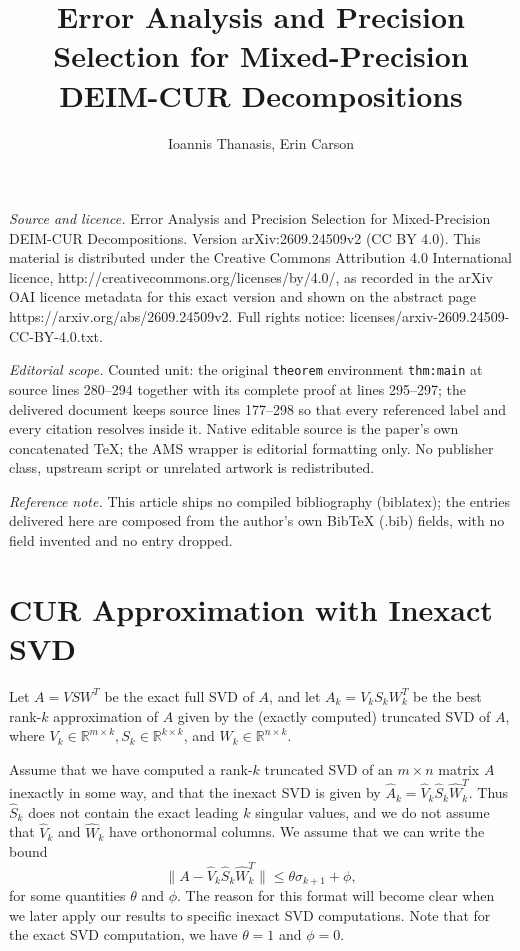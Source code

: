 \documentclass[10pt,a4paper]{amsart}
\newcommand{\What}{\widehat{W}}
\newcommand{\Shat}{\widehat{S}}
\newcommand{\Vhat}{\widehat{V}}
\newcommand{\E}{\theta}
\newcommand{\F}{\phi}
\def\norm#1{\|#1\|}
\begin{document}
\title[Error Analysis and Precision Selection for Mixed-Precision D]{Error Analysis and Precision Selection for Mixed-Precision DEIM-CUR Decompositions}
\author{Ioannis Thanasis, Erin Carson}
\date{}
\maketitle
\noindent\emph{Source and licence.} Error Analysis and Precision Selection for Mixed-Precision DEIM-CUR Decompositions. Version arXiv:2609.24509v2 (CC BY 4.0). This material is distributed under the Creative Commons Attribution 4.0 International licence, http://creativecommons.org/licenses/by/4.0/, as recorded in the arXiv OAI licence metadata for this exact version and shown on the abstract page https://arxiv.org/abs/2609.24509v2. Full rights notice: licenses/arxiv-2609.24509-CC-BY-4.0.txt.\par\smallskip
\noindent\textit{Editorial scope.} Counted unit: the original \texttt{theorem} environment \texttt{thm:main} at source lines 280--294 together with its complete proof at lines 295--297; the delivered document keeps source lines 177--298 so that every referenced label and every citation resolves inside it. Native editable source is the paper's own concatenated TeX; the AMS wrapper is editorial formatting only. No publisher class, upstream script or unrelated artwork is redistributed.
\par\smallskip\noindent\textit{Reference note.} This article ships no compiled bibliography (biblatex); the entries delivered here are composed from the author's own BibTeX (.bib) fields, with no field invented and no entry dropped.
\section{CUR Approximation with Inexact SVD}
\label{sec:inexactSVD}

\hspace{5mm}Let $A = V S W^T$ be the exact full SVD of $A$, and let $A_k = V_k S_k W_k^T$ be the best rank-$k$ approximation of $A$ given by the (exactly computed) truncated SVD of $A$, where $V_k \in \mathbb{R}^{m\times k}, S_k \in \mathbb{R}^{k \times k}$, and $W_k \in \mathbb{R}^{n \times k}$. 

Assume that we have computed a rank-$k$ truncated SVD of an $m\times n$ matrix $A$ inexactly in some way, and that the inexact SVD is given by $\widehat{A}_k = \Vhat_k \Shat_k \What_k^T$. Thus $\Shat_k$ does not contain the exact leading $k$ singular values, and we do not assume that $\Vhat_k$ and $\What_k$ have orthonormal columns. 
We assume that we can write the bound
 \begin{equation}
 \norm{A-\Vhat_k \Shat_k \What_k^T} \leq \E \sigma_{k+1} +\F,
 \label{eq:inexactSVD}
 \end{equation}
for some quantities $\E$ and $\F$. The reason for this format will become clear when we later apply our results to specific inexact SVD computations. Note that for the exact SVD computation, we have $\E=1$ and $\F=0$.
\end{document}
